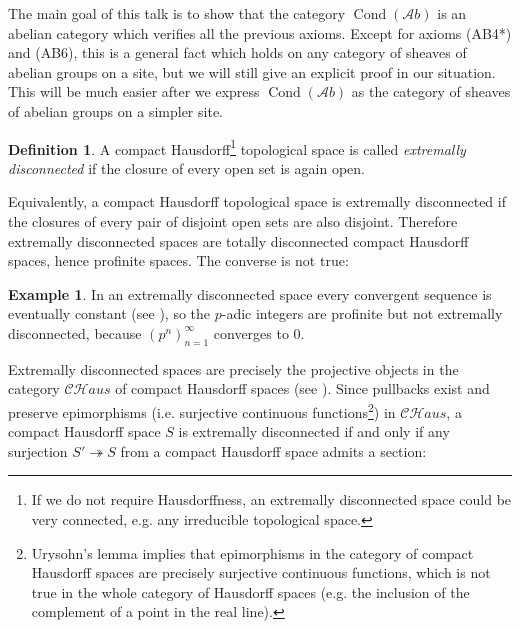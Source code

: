 \documentclass[11pt,A4]{article}
\theoremstyle{plain}
\theoremstyle{definition}
\newtheorem{defn}[thm]{Definition}
\newtheorem{exa}[thm]{Example}
\theoremstyle{remark}
\newcommand{\1}{\mathbbm{1}}
\newcommand{\CHaus}{\mathscr{CH}aus}
\newcommand{\Ab}{\mathscr{A}b}
\DeclareMathOperator{\Cond}{Cond}
\begin{document}
The main goal of this talk is to show that the category $\Cond(\Ab)$ is an abelian category which verifies all the previous axioms.
Except for axioms (AB4*) and (AB6), this is a general fact which holds on any category of sheaves of abelian groups on a site, but we will still give an explicit proof in our situation.
This will be much easier after we express $\Cond(\Ab)$ as the category of sheaves of abelian groups on a simpler site.

\begin{defn}
    A compact Hausdorff\footnote{If we do not require Hausdorffness, an extremally disconnected space could be very connected, e.g. any irreducible topological space.} topological space is called \textit{extremally disconnected} if the closure of every open set is again open.
\end{defn}

Equivalently, a compact Hausdorff topological space is extremally disconnected if the closures of every pair of disjoint open sets are also disjoint.
Therefore extremally disconnected spaces are totally disconnected compact Hausdorff spaces, hence profinite spaces.
The converse is not true:

\begin{exa}
    In an extremally disconnected space every convergent sequence is eventually constant (see \cite[Theorem 1.3]{gle58}), so the $p$-adic integers are profinite but not extremally disconnected, because $(p^{n})_{n=1}^{\infty}$ converges to $0$.
\end{exa}
    
Extremally disconnected spaces are precisely the projective objects in the category $\CHaus$ of compact Hausdorff spaces (see \cite[Theorem 2.5]{gle58}).
Since pullbacks exist and preserve epimorphisms (i.e. surjective continuous functions\footnote{Urysohn's lemma implies that epimorphisms in the category of compact Hausdorff spaces are precisely surjective continuous functions, which is not true in the whole category of Hausdorff spaces (e.g. the inclusion of the complement of a point in the real line).}) in $\CHaus$, a compact Hausdorff space $S$ is extremally disconnected if and only if any surjection $S'\twoheadrightarrow S$ from a compact Hausdorff space admits a section:
\begin{center}
\end{center}
\end{document}
